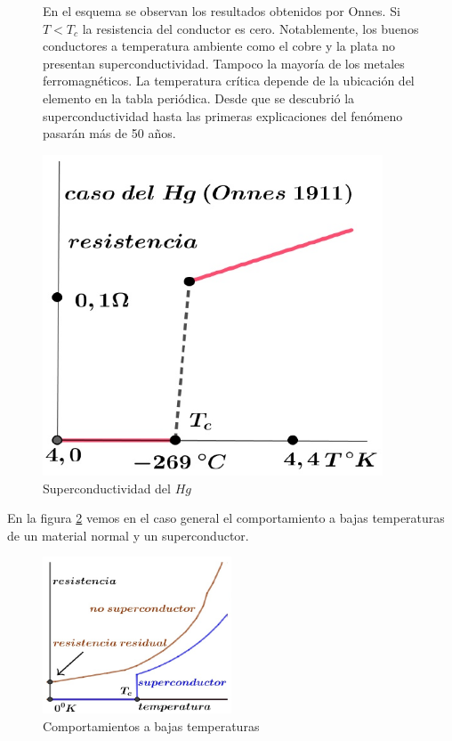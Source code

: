 \begin{figure}[H]
  \begin{minipage}[b]{0.47\textwidth}
En el esquema se observan los resultados obtenidos por Onnes. Si $T<T_{c}$ la resistencia del conductor es cero. Notablemente, los buenos conductores a temperatura ambiente como el cobre y la plata no presentan superconductividad. Tampoco la mayoría de los metales ferromagnéticos. La temperatura crítica depende de la ubicación del elemento en la tabla periódica. Desde que se descubrió la superconductividad hasta las primeras explicaciones del fenómeno pasarán más de 50 años.
  \vspace{0.0cm}
  \end{minipage}
  \hfill
  \begin{minipage}[b]{0.47\textwidth}
     \includegraphics[width=0.9\textwidth]{./Figures/fig44}
     \caption{Superconductividad del $Hg$}
	\label{fig:44}
	  \vspace{0.0cm}
  \end{minipage}
\end{figure}

En la figura \ref{fig:45} vemos en el caso general el comportamiento a bajas temperaturas de un material normal y un superconductor.

\begin{figure}[H]
    \centering
    \includegraphics[width=0.5\textwidth]{./Figures/fig45}
	\caption{Comportamientos a bajas temperaturas}
	\label{fig:45}
\end{figure}
	




